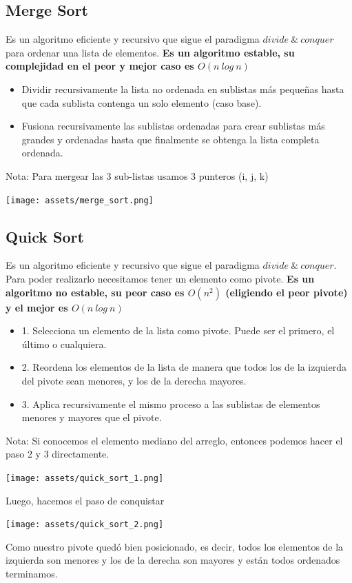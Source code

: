 \documentclass[10pt,a4paper]{article}
\begin{document}
\subsection*{Merge Sort}
Es un algoritmo eficiente y recursivo que sigue el paradigma $divide \ \& \ conquer$ para ordenar una lista de elementos. \textbf{Es un algoritmo estable, su complejidad en el peor y mejor caso es $O(n \ log \ n)$}
\begin{itemize}
    \item Dividir recursivamente la lista no ordenada en sublistas más pequeñas hasta que cada sublista contenga un solo elemento (caso base).
    \item Fusiona recursivamente las sublistas ordenadas para crear sublistas más grandes y ordenadas hasta que finalmente se obtenga la lista completa ordenada.
\end{itemize}
Nota: Para mergear las 3 sub-listas usamos 3 punteros (i, j, k)
\begin{center}
    \begin{minipage}[b]{0.7\textwidth}
        \texttt{[image: assets/merge\_sort.png]}
        \centering
        \label{fig:merge_sort}
    \end{minipage}
\end{center}
\subsection*{Quick Sort}
Es un algoritmo eficiente y recursivo que sigue el paradigma $divide \ \& \ conquer$. Para poder realizarlo necesitamos tener un elemento como pivote. \textbf{Es un algoritmo no estable, su peor caso es $O(n^{2})$ (eligiendo el peor pivote) y el mejor es $O(n \ log \ n)$}
\begin{itemize}
    \item 1. Selecciona un elemento de la lista como pivote. Puede ser el primero, el último o cualquiera.
    \item 2. Reordena los elementos de la lista de manera que todos los de la izquierda del pivote sean menores, y los de la derecha mayores.
    \item 3. Aplica recursivamente el mismo proceso a las sublistas de elementos menores y mayores que el pivote.
\end{itemize}
Nota: Si conocemos el elemento mediano del arreglo, entonces podemos hacer el paso 2 y 3 directamente.
\begin{center}
    \begin{minipage}[b]{0.5\textwidth}
        \texttt{[image: assets/quick\_sort\_1.png]}
        \centering
        \label{fig:quick_sort_1}
    \end{minipage}
\end{center}
Luego, hacemos el paso de conquistar
\begin{center}
    \begin{minipage}[b]{0.5\textwidth}
        \texttt{[image: assets/quick\_sort\_2.png]}
        \centering
        \label{fig:quick_sort_2}
    \end{minipage}
\end{center}
Como nuestro pivote quedó bien posicionado, es decir, todos los elementos de la izquierda son menores y los de la derecha son mayores y están todos ordenados terminamos.
\end{document}
